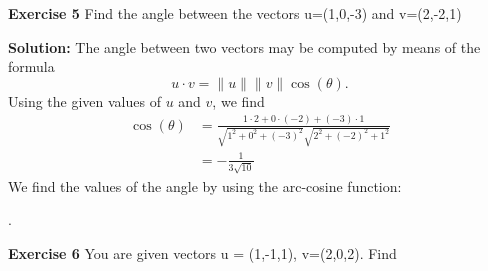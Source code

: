 \documentclass[12pt,oneside]{exam}
\newenvironment{exercise}[1]{\vspace{.1in}\noindent\textbf{Exercise #1 \hspace{.05em}}}{}
\newenvironment{newsolution}{\vspace{.1in}\noindent\textbf{Solution: \hspace{.05em}}}{}
\begin{document}
\begin{exercise}{5}
Find the angle between the vectors u=(1,0,-3) and v=(2,-2,1)
\end{exercise}

\begin{newsolution}
The angle between two vectors may be computed by means of the formula
\begin{equation*}
u \cdot v = \|u \| \|v\| \cos(\theta).
\end{equation*}
Using the given values of $u$ and $v$, we find
\begin{align*}
\cos(\theta)  & = \frac{1\cdot 2+ 0 \cdot (-2) + (-3) \cdot 1}{\sqrt{1^2+0^2+(-3)^2}\sqrt{2^2+(-2)^2+1^2}} \\
& = -\frac{1}{3\sqrt{10}}
\end{align*}
We find the values of the angle by using the arc-cosine function:
\end{newsolution}. 

\begin{exercise}{6}
You are given vectors u = (1,-1,1), v=(2,0,2). Find 
\end{exercise}
\end{document}
